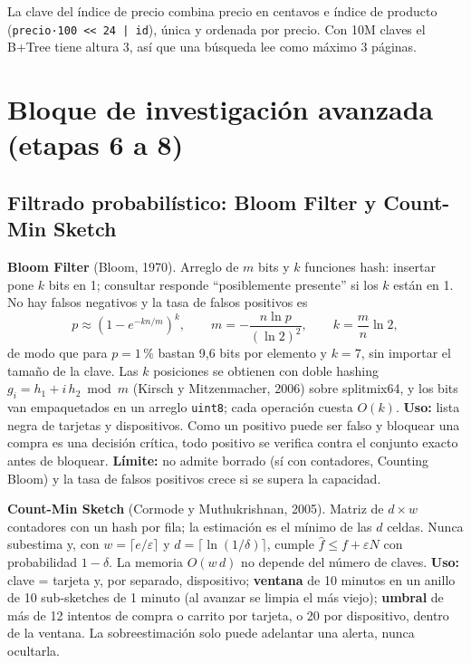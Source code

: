 \documentclass[11pt,letterpaper]{article}
\begin{document}
La clave del índice de precio combina precio en centavos e índice de producto (\texttt{precio·100 << 24 | id}), única y ordenada por precio. Con 10M claves el B+Tree tiene altura 3, así que una búsqueda lee como máximo 3 páginas.

\section{Bloque de investigación avanzada (etapas 6 a 8)}

\subsection{Filtrado probabilístico: Bloom Filter y Count-Min Sketch}

\textbf{Bloom Filter} (Bloom, 1970). Arreglo de $m$ bits y $k$ funciones hash: insertar pone $k$ bits en 1; consultar responde ``posiblemente presente'' si los $k$ están en 1. No hay falsos negativos y la tasa de falsos positivos es
\[ p \approx \left(1 - e^{-kn/m}\right)^{k}, \qquad m = -\frac{n \ln p}{(\ln 2)^2}, \qquad k = \frac{m}{n}\ln 2, \]
de modo que para $p = 1$\,\% bastan 9{,}6 bits por elemento y $k = 7$, sin importar el tamaño de la clave. Las $k$ posiciones se obtienen con doble hashing $g_i = h_1 + i\,h_2 \bmod m$ (Kirsch y Mitzenmacher, 2006) sobre splitmix64, y los bits van empaquetados en un arreglo \texttt{uint8}; cada operación cuesta $O(k)$. \textbf{Uso:} lista negra de tarjetas y dispositivos. Como un positivo puede ser falso y bloquear una compra es una decisión crítica, todo positivo se verifica contra el conjunto exacto antes de bloquear. \textbf{Límite:} no admite borrado (sí con contadores, Counting Bloom) y la tasa de falsos positivos crece si se supera la capacidad.

\textbf{Count-Min Sketch} (Cormode y Muthukrishnan, 2005). Matriz de $d \times w$ contadores con un hash por fila; la estimación es el mínimo de las $d$ celdas. Nunca subestima y, con $w = \lceil e/\varepsilon \rceil$ y $d = \lceil \ln(1/\delta) \rceil$, cumple $\hat f \le f + \varepsilon N$ con probabilidad $1-\delta$. La memoria $O(w\,d)$ no depende del número de claves. \textbf{Uso:} clave = tarjeta y, por separado, dispositivo; \textbf{ventana} de 10 minutos en un anillo de 10 sub-sketches de 1 minuto (al avanzar se limpia el más viejo); \textbf{umbral} de más de 12 intentos de compra o carrito por tarjeta, o 20 por dispositivo, dentro de la ventana. La sobreestimación solo puede adelantar una alerta, nunca ocultarla.
\end{document}
